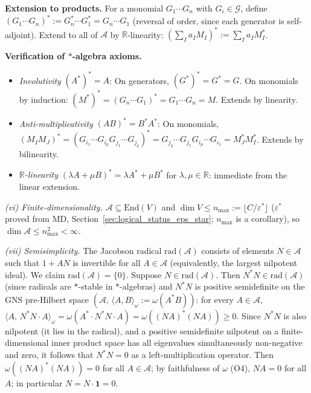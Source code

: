 \documentclass[11pt]{article}
\theoremstyle{remark}
\begin{document}
\textbf{Extension to products.}  For a monomial $G_1 \cdots G_n$ with $G_i \in \mathcal{G}$, define
$(G_1 \cdots G_n)^* := G_n^* \cdots G_1^* = G_n \cdots G_1$
(reversal of order, since each generator is self-adjoint).  Extend to all of $\mathcal{A}$ by $\mathbb{R}$-linearity: $(\sum_I a_I M_I)^* := \sum_I a_I M_I^*$.

\textbf{Verification of $*$-algebra axioms.}
\begin{itemize}[nosep,leftmargin=2em]
\item \emph{Involutivity} $(A^*)^* = A$: On generators, $(G^*)^* = G^* = G$.  On monomials by induction: $(M^*)^* = (G_n\cdots G_1)^* = G_1\cdots G_n = M$.  Extends by linearity.
\item \emph{Anti-multiplicativity} $(AB)^* = B^* A^*$: On monomials, $(M_I M_J)^* = (G_{i_1}\cdots G_{i_p} G_{j_1}\cdots G_{j_q})^* = G_{j_q}\cdots G_{j_1} G_{i_p}\cdots G_{i_1} = M_J^* M_I^*$.  Extends by bilinearity.
\item \emph{$\mathbb{R}$-linearity} $(\lambda A + \mu B)^* = \lambda A^* + \mu B^*$ for $\lambda, \mu \in \mathbb{R}$: immediate from the linear extension.
\end{itemize}

\textit{(vi) Finite-dimensionality.}  $\mathcal{A} \subseteq \mathrm{End}(V)$ and $\dim V \le n_{\max} := \lfloor C/\varepsilon^* \rfloor$ ($\varepsilon^*$ proved from MD, Section~\ref{sec:logical_status_eps_star}; $n_{\max}$ is a corollary), so $\dim \mathcal{A} \le n_{\max}^2 < \infty$.

\textit{(vii) Semisimplicity.}  The Jacobson radical $\mathrm{rad}(\mathcal{A})$ consists of elements $N \in \mathcal{A}$ such that $1 + AN$ is invertible for all $A \in \mathcal{A}$ (equivalently, the largest nilpotent ideal).  We claim $\mathrm{rad}(\mathcal{A}) = \{0\}$.  Suppose $N \in \mathrm{rad}(\mathcal{A})$.  Then $N^* N \in \mathrm{rad}(\mathcal{A})$ (since radicals are $*$-stable in $*$-algebras) and $N^* N$ is positive semidefinite on the GNS pre-Hilbert space $(\mathcal{A},\, \langle A,B\rangle_\omega := \omega(A^*B))$: for every $A \in \mathcal{A}$, $\langle A,\, N^*N \cdot A\rangle_\omega = \omega(A^* \cdot N^*N \cdot A) = \omega((NA)^*(NA)) \ge 0$.  Since $N^*N$ is also nilpotent (it lies in the radical), and a positive semidefinite nilpotent on a finite-dimensional inner product space has all eigenvalues simultaneously non-negative and zero, it follows that $N^*N = 0$ as a left-multiplication operator.  Then $\omega((NA)^*(NA)) = 0$ for all $A \in \mathcal{A}$; by faithfulness of $\omega$ (O4), $NA = 0$ for all $A$; in particular $N = N \cdot \mathbf{1} = 0$.
\end{document}
